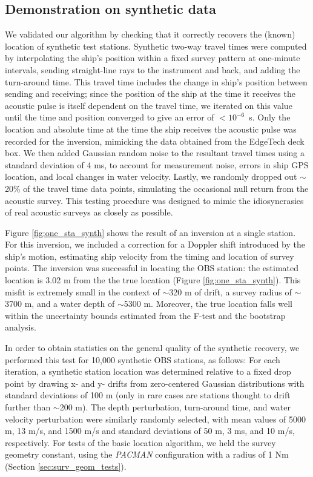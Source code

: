 
\subsection{Demonstration on synthetic data}
We validated our algorithm by checking that it correctly recovers the (known) location of synthetic test stations. Synthetic two-way travel times were computed by interpolating the ship's position within a fixed survey pattern at one-minute intervals, sending straight-line rays to the instrument and back, and adding the turn-around time. This travel time includes the change in ship's position between sending and receiving; since the position of the ship at the time it receives the acoustic pulse is itself dependent on the travel time, we iterated on this value until the time and position converged to give an error of \mbox{$<10^{-6}$ s}. Only the location and absolute time at the time the ship receives the acoustic pulse was recorded for the inversion, mimicking the data obtained from the EdgeTech deck box. We then added Gaussian random noise to the resultant travel times using a standard deviation of 4 ms, to account for measurement noise, errors in ship GPS location, and local changes in water velocity. Lastly, we randomly dropped out $\sim$20\% of the travel time data points, simulating the occasional null return from the acoustic survey. This testing procedure was designed to mimic the idiosyncrasies of real acoustic surveys as closely as possible. 

Figure \ref{fig:one_sta_synth} shows the result of an inversion at a single station. For this inversion, we included a correction for a Doppler shift introduced by the ship's motion, estimating ship velocity from the timing and location of survey points. The inversion was successful in locating the OBS station: the estimated location is 3.02 m from the the true location (Figure \ref{fig:one_sta_synth}). This misfit is extremely small in the context of $\sim$320 m of drift, a survey radius of $\sim$3700 m, and a water depth of $\sim$5300 m. Moreover, the true location falls well within the uncertainty bounds estimated from the F-test and the bootstrap analysis. 

In order to obtain statistics on the general quality of the synthetic recovery, we performed this test for 10,000 synthetic OBS stations, as follows: For each iteration, a synthetic station location was determined relative to a fixed drop point by drawing x- and y- drifts from zero-centered Gaussian distributions with standard deviations of 100 m (only in rare cases are stations thought to drift further than $\sim$200 m). The depth perturbation, turn-around time, and water velocity perturbation were similarly randomly selected, with mean values of 5000 m, 13 m/s, and 1500 m/s and standard deviations of 50 m, 3 ms, and 10 m/s, respectively.  For tests of the basic location algorithm, we held the survey geometry constant, using the \textit{PACMAN} configuration with a radius of 1 Nm (Section \ref{sec:surv_geom_tests}). 

